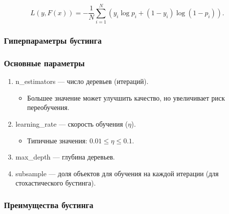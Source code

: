 \begin{enumerate}
\begin{equation}
     L(y, F(x)) = - \frac{1}{N} \sum_{i=1}^N \left( y_i \log p_i + (1 - y_i) \log (1 - p_i) \right).
\end{equation}

\hypertarget{ux433ux438ux43fux435ux440ux43fux430ux440ux430ux43cux435ux442ux440ux44b-ux431ux443ux441ux442ux438ux43dux433ux430}{%
\subsubsection*{Гиперпараметры
бустинга}\label{ux433ux438ux43fux435ux440ux43fux430ux440ux430ux43cux435ux442ux440ux44b-ux431ux443ux441ux442ux438ux43dux433ux430}}

\hypertarget{ux43eux441ux43dux43eux432ux43dux44bux435-ux43fux430ux440ux430ux43cux435ux442ux440ux44b}{%
\subsubsection*{Основные
параметры}\label{ux43eux441ux43dux43eux432ux43dux44bux435-ux43fux430ux440ux430ux43cux435ux442ux440ux44b}}

\begin{enumerate}
\def\labelenumi{\arabic{enumi}.}
\tightlist
\item
  n\_estimators --- число деревьев (итераций).

  \begin{itemize}
  \tightlist
  \item
    Большее значение может улучшить качество, но увеличивает риск
    переобучения.
  \end{itemize}
\item
  learning\_rate --- скорость обучения (\(\eta\)).

  \begin{itemize}
  \tightlist
  \item
    Типичные значения: \(0.01 \leq \eta \leq 0.1\).
  \end{itemize}
\item
  max\_depth --- глубина деревьев.
\item
  subsample --- доля объектов для обучения на каждой итерации
  (для стохастического бустинга).
\end{enumerate}

\hypertarget{ux43fux440ux435ux438ux43cux443ux449ux435ux441ux442ux432ux430-ux431ux443ux441ux442ux438ux43dux433ux430}{%
\subsubsection*{Преимущества
бустинга}\label{ux43fux440ux435ux438ux43cux443ux449ux435ux441ux442ux432ux430-ux431ux443ux441ux442ux438ux43dux433ux430}}


\end{enumerate}

